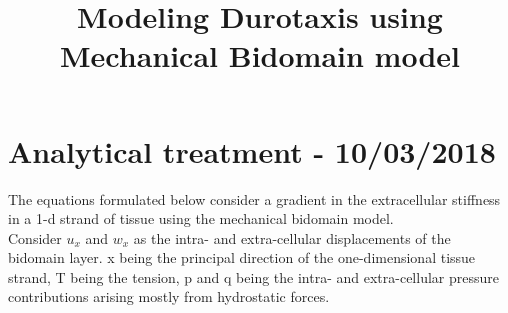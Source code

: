 \documentclass[a4paper,oneside,11pt]{report}
\title{Modeling Durotaxis using Mechanical Bidomain model}
\begin{document}
\maketitle
\section*{Analytical treatment - 10/03/2018}
The equations formulated below consider a gradient in the extracellular stiffness in a 1-d strand of tissue using the mechanical bidomain model. \\

Consider $u_{x}$ and $w_{x}$ as the intra- and extra-cellular displacements of the bidomain layer. x being the principal direction of the one-dimensional tissue strand, T being the tension, p and q being the intra- and extra-cellular pressure contributions arising mostly from hydrostatic forces. \\
\end{document}
